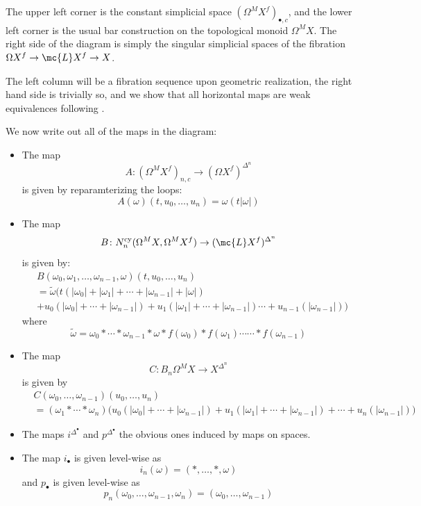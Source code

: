 \documentclass[11pt]{amsart}
\begin{document}
The upper left corner is the constant simplicial space $(\Omega^M X^f)_{\bullet,c}$, and the lower left corner is the usual bar construction on the topological monoid $\Omega^M X$. The right side of the diagram is simply the singular simplicial spaces of the fibration $\Omega X^f \to \mc{L} X^f \to X$.

The left column will be a fibration sequence upon geometric realization, the right hand side is trivially so, and we show that all horizontal maps are weak equivalences following \cite{goodwillie_cyclic}. 

We now write out all of the maps in the diagram:

\begin{itemize}
\item The map
\[
A \colon  (\Omega^M X^f)_{n,c} \to (\Omega X^f)^{\Delta^n} 
\]
is given by reparamterizing the loops:
\[
A (\omega) (t, u_0, \dots, u_n) = \omega(t|\omega|) 
\]

\item 
The map
\[
B \colon  N^{\text{cy}}_{n} (\Omega^M X, \Omega^M X^f) \to (\mc{L} X^f)^{\Delta^n}
\]
is given by:
\begin{align*}
  &B(\omega_0, \omega_1, \dots, \omega_{n-1}, \omega)(t, u_0, \dots, u_n) \\
  &= \widetilde{\omega}\biggl(t (|\omega_0| + |\omega_1| + \cdots + |\omega_{n-1}| + |\omega|)\\
  &+ u_0 (|\omega_0| + \cdots + |\omega_{n-1}|)
  + u_1 (|\omega_1| + \cdots + |\omega_{n-1}|) 
  \cdots
  + u_{n-1} (|\omega_{n-1}|)\biggr)
\end{align*} 
where
\[
\widetilde{\omega} = \omega_0 \ast \cdots \ast \omega_{n-1} \ast \omega \ast f(\omega_0) \ast f(\omega_1) \cdots \cdots \ast f(\omega_{n-1}) 
\]

\item The map
  \[
  C\colon  B_n \Omega^M X \to X^{\Delta^n} 
  \]
  is given by
  \begin{align*}
    &C(\omega_0, \dots, \omega_{n-1})(u_0, \dots, u_n)\\ &= (\omega_1 \ast \cdots \ast \omega_n)\biggl( u_0 (|\omega_0| + \cdots + |\omega_{n-1}|)
    +u_1 (|\omega_1| + \cdots + |\omega_{n-1}|)+
    \cdots+
    u_{n} (|\omega_{n-1}|)\biggr)
  \end{align*}

\item The  maps $i^{\Delta^\bullet}$ and $p^{\Delta^\bullet}$ the obvious ones induced by maps on spaces.
\item The map $i_\bullet$ is given level-wise as
  \[
  i_n (\omega) = (\ast, \dots, \ast, \omega)
  \]
  and $p_\bullet$ is given level-wise as
  \[
  p_n (\omega_0, \dots, \omega_{n-1}, \omega_n) = (\omega_0, \dots, \omega_{n-1}) 
  \]
\end{itemize}
\end{document}
